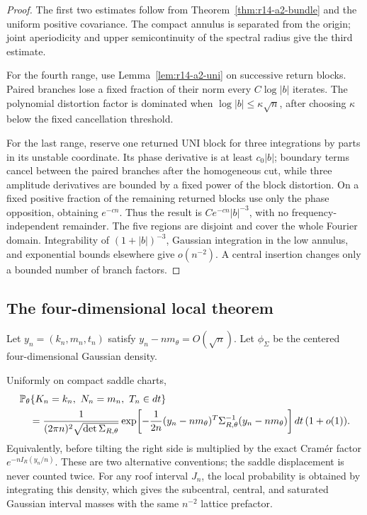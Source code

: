 \begin{proof}
The first two estimates follow from
Theorem~\ref{thm:r14-a2-bundle} and the uniform positive covariance.  The
compact annulus is separated from the origin; joint aperiodicity and upper
semicontinuity of the spectral radius give the third estimate.

For the fourth range, use Lemma~\ref{lem:r14-a2-uni} on successive return
blocks.  Paired branches lose a fixed fraction of their norm every
\(C\log|b|\) iterates.  The polynomial distortion factor is dominated when
\(\log|b|\le\kappa\sqrt n\), after choosing \(\kappa\) below the fixed
cancellation threshold.

For the last range, reserve one returned UNI block for three integrations by
parts in its unstable coordinate.  Its phase derivative is at least
\(c_0|b|\); boundary terms cancel between the paired branches after the
homogeneous cut, while three amplitude derivatives are bounded by a fixed
power of the block distortion.  On a fixed positive fraction of the remaining
returned blocks use only the phase opposition, obtaining \(e^{-cn}\).
Thus the result is \(Ce^{-cn}|b|^{-3}\), with no frequency-independent
remainder.  The five regions are disjoint and cover the whole Fourier
domain.  Integrability of \((1+|b|)^{-3}\), Gaussian integration in the low
annulus, and exponential bounds elsewhere give \(o(n^{-2})\).  A central
insertion changes only a bounded number of branch factors.
\end{proof}

\subsection{The four-dimensional local theorem}

Let \(y_n=(k_n,m_n,t_n)\) satisfy
\(y_n-nm_\theta=O(\sqrt n)\).  Let
\(\phi_{\Sigma}\) be the centered four-dimensional Gaussian density.

\begin{theorem}
\label{thm:r14-a2-llt}
Uniformly on compact saddle charts,
\[
 \begin{aligned}
 &\mathbb P_\theta
 \{K_n=k_n,\ N_n=m_n,\ T_n\in dt\}\\
 &\quad=
 {1\over (2\pi n)^2\sqrt{\det\Sigma_{R,\theta}}}
 \exp\!\left[
  -{1\over2n}(y_n-nm_\theta)^T
   \Sigma_{R,\theta}^{-1}(y_n-nm_\theta)
 \right]dt\,(1+o(1)).
 \end{aligned}
\]
Equivalently, before tilting the right side is multiplied by the exact
Cramér factor \(e^{-nI_R(y_n/n)}\).  These are two alternative conventions;
the saddle displacement is never counted twice.  For any roof interval
\(J_n\), the local probability is obtained by integrating this density, which
gives the subcentral, central, and saturated Gaussian interval masses with the
same \(n^{-2}\) lattice prefactor.
\end{theorem}

